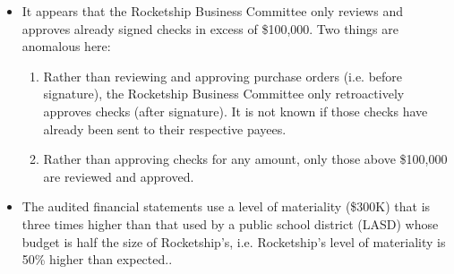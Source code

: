 \begin{itemize}
  \item It appears that the Rocketship Business Committee only reviews and approves already signed checks in excess of \$100,000. Two things are anomalous here:
  \begin{enumerate}
    \item Rather than reviewing and approving purchase orders (i.e. before signature), the Rocketship Business Committee only retroactively approves checks (after signature). It is not known if those checks have already been sent to their respective payees.
    \item Rather than approving checks for any amount, only those above \$100,000 are reviewed and approved.
  \end{enumerate}
  \item The audited financial statements use a level of materiality (\$300K) that is three times higher than that used by a public school district (LASD) whose budget is half the size of Rocketship's, i.e. Rocketship's level of materiality is 50\% higher than expected..


\end{itemize}
